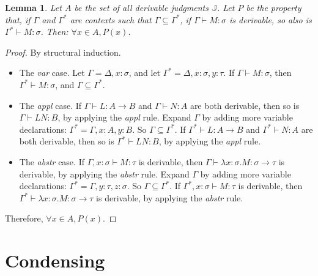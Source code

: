 \documentclass{book}
\numberwithin{equation}{chapter}
\newtheorem*{anon-lemma}{Lemma}
\begin{document}
\noindent
\hrulefill

\begin{anon-lemma}
Let $A$ be the set of all derivable judgments $\mathbb{J}$. Let $P$ be the property that, if $\Gamma$ and $\Gamma^{*}$ are contexts such that $\Gamma \subseteq \Gamma^{*}$, if $\Gamma \vdash M : \sigma$ is derivable, so also is $\Gamma^{*} \vdash M : \sigma$. Then: $\forall x \in A, P(x)$.
\end{anon-lemma}

\begin{proof}
By structural induction.

\begin{itemize}
\item{The \textit{var} case. Let $\Gamma = \Delta, x : \sigma$, and let $\Gamma^{*} = \Delta, x : \sigma, y : \tau$. If $\Gamma \vdash M : \sigma$, then $\Gamma^{*} \vdash M : \sigma$, and $\Gamma \subseteq \Gamma^{*}$.}

\item{The \textit{appl} case. If $\Gamma \vdash L : A \rightarrow B$ and $\Gamma \vdash N : A$ are both derivable, then so is $\Gamma \vdash LN : B$, by applying the \textit{appl} rule. Expand $\Gamma$ by adding more variable declarations: $\Gamma^{*} = \Gamma, x : A, y : B$.  So $\Gamma \subseteq \Gamma^{*}$. If $\Gamma^{*} \vdash L : A \rightarrow B$ and $\Gamma^{*} \vdash N : A$ are both derivable, then so is $\Gamma^{*} \vdash LN : B$, by applying the \textit{appl} rule.}

\item{The \textit{abstr} case. If $\Gamma, x : \sigma \vdash M : \tau$ is derivable, then $\Gamma \vdash \lambda x : \sigma.M : \sigma \rightarrow \tau$ is derivable, by applying the \textit{abstr} rule. Expand $\Gamma$ by adding more variable declarations: $\Gamma^{*} = \Gamma, y : \tau, z : \sigma$. So $\Gamma \subseteq \Gamma^{*}$. If $\Gamma^{*}, x : \sigma \vdash M : \tau$ is derivable, then $\Gamma^{*} \vdash \lambda x : \sigma.M : \sigma \rightarrow \tau$ is derivable, by applying the \textit{abstr} rule.}
\end{itemize}

\noindent
Therefore, $\forall x \in A, P(x)$.
\end{proof}

\noindent
\hrulefill
\newline


\section{Condensing}
\end{document}
